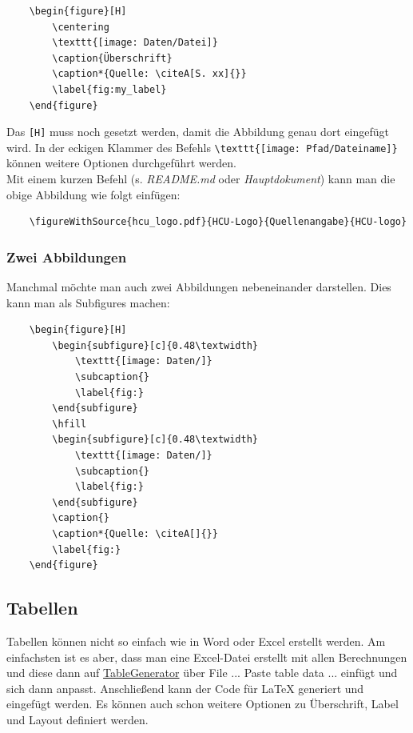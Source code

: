 \begin{verbatim}
    \begin{figure}[H]
        \centering
        \texttt{[image: Daten/Datei]}
        \caption{Überschrift}
        \caption*{Quelle: \citeA[S. xx]{}}
        \label{fig:my_label}
    \end{figure}
\end{verbatim}

Das \verb|[H]| muss noch gesetzt werden, damit die Abbildung genau dort eingefügt wird. In der eckigen Klammer des Befehls \verb|\texttt{[image: Pfad/Dateiname]}| können weitere Optionen durchgeführt werden.\\

Mit einem kurzen Befehl (s. \textit{README.md} oder \textit{Hauptdokument}) kann man die obige Abbildung wie folgt einfügen:

\begin{verbatim}
    \figureWithSource{hcu_logo.pdf}{HCU-Logo}{Quellenangabe}{HCU-logo}
\end{verbatim}

\subsubsection{Zwei Abbildungen}

Manchmal möchte man auch zwei Abbildungen nebeneinander darstellen. Dies kann man als Subfigures machen:

\begin{verbatim}
    \begin{figure}[H]
        \begin{subfigure}[c]{0.48\textwidth}
            \texttt{[image: Daten/]}
            \subcaption{}
            \label{fig:}
        \end{subfigure}
        \hfill
        \begin{subfigure}[c]{0.48\textwidth}
            \texttt{[image: Daten/]}
            \subcaption{}
            \label{fig:}
        \end{subfigure}
        \caption{}
        \caption*{Quelle: \citeA[]{}}
        \label{fig:}
    \end{figure}
\end{verbatim}


\subsection{Tabellen}

Tabellen können nicht so einfach wie in Word oder Excel erstellt werden. Am einfachsten ist es aber, dass man eine Excel-Datei erstellt mit allen Berechnungen und diese dann auf \href{https://www.tablesgenerator.com/latex_tables}{TableGenerator} über File ... Paste table data ... einfügt und sich dann anpasst. Anschließend kann der Code für \LaTeX{} generiert und eingefügt werden. Es können auch schon weitere Optionen zu Überschrift, Label und Layout definiert werden.

